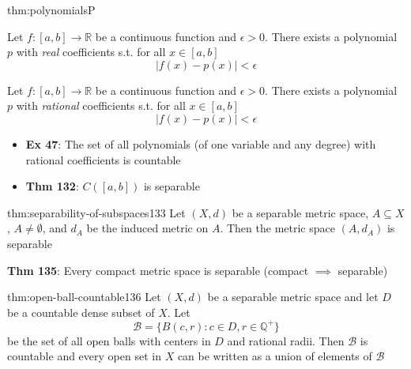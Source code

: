 \documentclass[landscape, 8pt]{extarticle}
\begin{document}
\begin{multicols}{3}
\begin{thm}[Polynomials]{thm:polynomials}{P}
    \vspace{-5pt}

    Let $f : [a, b]\to \mathbb{R}$ be a continuous function and $\epsilon > 0$. There exists a polynomial $p$ with \textit{real} coefficients s.t. for all $x\in [a,b]$
    \[\lvert f(x) - p(x) \rvert < \epsilon\]


    Let $f : [a,b]\to \mathbb{R}$ be a continuous function and $\epsilon > 0$. There exists a polynomial $p$ with \textit{rational} coefficients s.t. for all $x\in [a,b]$
    \[\lvert f(x) - p(x) \rvert < \epsilon\]

    \vspace{-8pt}

    \begin{itemize}[leftmargin=*]
        \item \textbf{Ex 47}: The set of all polynomials (of one variable and any degree) with rational coefficients is countable
        \item \textbf{Thm 132}: $C([a,b])$ is separable
    \end{itemize}
\end{thm}

\begin{thm}{thm:separability-of-subspaces}{133}
    Let $(X, d)$ be a separable metric space, $A \subseteq X$, $A \ne \emptyset$, and $d_{A}$ be the induced metric on $A$. Then the metric space $(A, d_{A})$ is separable

    \longrule{0.08ex}
    \textbf{Thm 135}: Every compact metric space is separable (compact $\implies$ separable)
\end{thm}

\begin{thm}{thm:open-ball-countable}{136}
    \vspace{-5pt}
    Let $(X, d)$ be a separable metric space and let $D$ be a countable dense subset of $X$. Let
    \[\mathcal{B} = \{B(c, r): c\in D, r\in \mathbb{Q}^{+}\}\]
    be the set of all open balls with centers in $D$ and rational radii. Then $\mathcal{B}$ is countable and every open set in $X$ can be written as a union of elements of $\mathcal{B}$
\end{thm}


\end{multicols}
\end{document}
